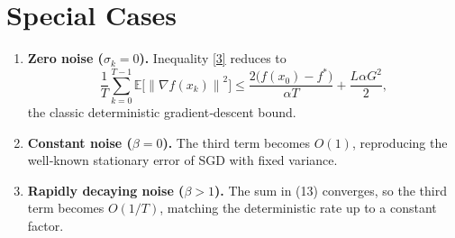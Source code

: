 \documentclass{article}
\newcommand{\E}{\mathbb{E}}
\newcommand{\norm}[1]{\left\|#1\right\|}
\begin{document}
\section*{Special Cases}
\begin{enumerate}
\item \textbf{Zero noise ($\sigma_{k}=0$).} Inequality \eqref{3} reduces to
\[
\frac{1}{T}\sum_{k=0}^{T-1}\E\!\bigl[\norm{\nabla f(x_{k})}^{2}\bigr]
\le \frac{2\bigl(f(x_{0})-f^{*}\bigr)}{\alpha T}
+\frac{L\alpha G^{2}}{2},
\]
the classic deterministic gradient‑descent bound.
\item \textbf{Constant noise ($\beta=0$).} The third term becomes $O(1)$, reproducing the well‑known stationary error of SGD with fixed variance.
\item \textbf{Rapidly decaying noise ($\beta>1$).} The sum in (13) converges, so the third term becomes $O(1/T)$, matching the deterministic rate up to a constant factor.
\end{enumerate}
\end{document}
